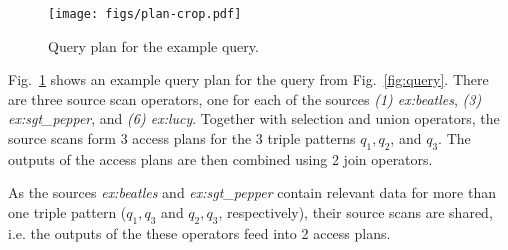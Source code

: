 %  	


\begin{figure}[htb]
  \centering
  \texttt{[image: figs/plan-crop.pdf]}
  \caption{Query plan for the example query.}
\label{fig:plan}
\end{figure}

\begin{example}
  Fig.~\ref{fig:plan} shows an example query plan for the 
  query from Fig.~\ref{fig:query}. There are three source scan
  operators, one for each of the sources \emph{(1) ex:beatles},
  \emph{(3) ex:sgt\_pepper}, and \emph{(6) ex:lucy}. Together with 
  selection and union operators, the source scans form 3 access
  plans for the 3 triple patterns $q_1, q_2$, and $q_3$.  The
  outputs of the access plans are then combined using 2 join operators.

  As the sources \emph{ex:beatles} and \emph{ex:sgt\_pepper} contain
  relevant data for more than one triple pattern ($q_1,q_3$ and
  $q_2,q_3$, respectively), their source scans are shared, i.e. the
  outputs of the these operators feed into 2 access plans.
\end{example}


